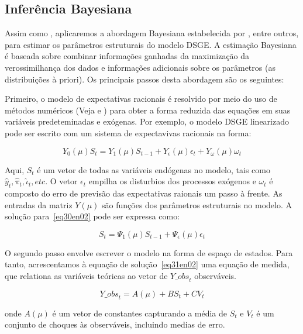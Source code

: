 \documentclass[twoside,a4paper,11pt]{report}
\begin{document}
{{\subsection*{Inferência Bayesiana}

Assim como \citet{yao2010aggregate}, aplicaremos a abordagem Bayesiana estabelecida por \citet{dejong2000bayesian}, \citet{schorfheide2000loss} entre outros, para estimar os parâmetros estruturais do modelo DSGE. A estimação Bayesiana é baseada sobre combinar informações ganhadas da maximização da verossimilhança dos dados e informações adicionais sobre os parâmetros (as distribuições à priori). Os principais passos desta abordagem são os seguintes:

Primeiro, o modelo de expectativas racionais é resolvido por meio do uso de métodos numéricos (Veja \citet{sims2002solving} e \citet{uhlig1998toolkit}) para obter a forma reduzida das equações em suas variáveis predeteminadas e exógenas. Por exemplo, o modelo DSGE linearizado pode ser escrito com um sistema de expectavivas racionais na forma:

\begin{equation}\label{eq30en02}
{Y}_{0}(\mu){S}_{t}={Y}_{1}(\mu){S}_{t-1}+{Y}_{\epsilon}(\mu){\epsilon_{t}}+{Y}_{\omega  }(\mu) {\omega}_{t}
\end{equation}

Aqui, ${S}_{t}$ é um vetor de todas as variáveis endógenas no modelo, tais como ${\hat{y}}_{t},{\hat{\pi}}_{t},{\hat{\iota}}_{t}, etc$. O vetor ${\epsilon_{t}}$ empilha os disturbios dos processos exógenos e ${\omega}_{t}$ é composto do erro de previsão das expectativas raionais um passo à frente. As entradas da matriz ${Y}(\mu)$ são funções dos parâmetros estruturais no modelo. A solução para~\ref{eq30en02} pode ser expressa como:

\begin{equation}\label{eq31en02}
{S}_{t}={\Psi}_{1}(\mu){S}_{t-1}+{\Psi}_{\epsilon}(\mu){\epsilon}_{t}
\end{equation}

O segundo passo envolve escrever o modelo na forma de espaço de estados. Para tanto, acrescentamos à equação de solução~\ref{eq31en02} uma equação de medida, que relationa as variáveis teóricas ao vetor de ${Y\_ obs}_{t}$ observáveis. 

\begin{equation}\label{eq32en02}
{Y\_ obs}_{t}=A(\mu)+B{S}_{t}+{CV}_{t}
\end{equation}

\noindent onde $A(\mu)$ é um vetor de constantes capturando a média de $S_{t}$ e $V_{t}$ é um conjunto de choques às observáveis, incluindo medias de erro. 

}}
\end{document}
